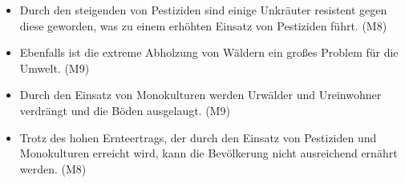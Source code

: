 \documentclass[./entry.tex]{subfiles}
\begin{document}
    \begin{itemize}
        \item Durch den steigenden von Pestiziden sind einige Unkräuter resistent gegen diese geworden,
        was zu einem erhöhten Einsatz von Pestiziden führt. (M8)
        \item Ebenfalls ist die extreme Abholzung von Wäldern ein großes Problem
        für die Umwelt. (M9)
        \item Durch den Einsatz von Monokulturen werden Urwälder und Ureinwohner verdrängt
        und die Böden ausgelaugt. (M9)
        \item Trotz des hohen Ernteertrags, der durch den Einsatz von Pestiziden und Monokulturen erreicht wird,
        kann die Bevölkerung nicht ausreichend ernährt werden. (M8)
    \end{itemize}
\end{document}
